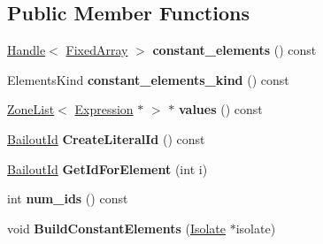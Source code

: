 \subsection*{Public Member Functions}
\begin{DoxyCompactItemize}
\item 
\hyperlink{classv8_1_1internal_1_1_handle}{Handle}$<$ \hyperlink{classv8_1_1internal_1_1_fixed_array}{Fixed\+Array} $>$ {\bfseries constant\+\_\+elements} () const \hypertarget{classv8_1_1internal_1_1_array_literal_a002a9a13a866683dfd5eda8c79262fb7}{}\label{classv8_1_1internal_1_1_array_literal_a002a9a13a866683dfd5eda8c79262fb7}

\item 
Elements\+Kind {\bfseries constant\+\_\+elements\+\_\+kind} () const \hypertarget{classv8_1_1internal_1_1_array_literal_ad4dadd0d290f1922ef4529c2e45ba332}{}\label{classv8_1_1internal_1_1_array_literal_ad4dadd0d290f1922ef4529c2e45ba332}

\item 
\hyperlink{classv8_1_1internal_1_1_zone_list}{Zone\+List}$<$ \hyperlink{classv8_1_1internal_1_1_expression}{Expression} $\ast$ $>$ $\ast$ {\bfseries values} () const \hypertarget{classv8_1_1internal_1_1_array_literal_ad67607b8facceaf7e6af416e265ede83}{}\label{classv8_1_1internal_1_1_array_literal_ad67607b8facceaf7e6af416e265ede83}

\item 
\hyperlink{classv8_1_1internal_1_1_bailout_id}{Bailout\+Id} {\bfseries Create\+Literal\+Id} () const \hypertarget{classv8_1_1internal_1_1_array_literal_a75c6a1be5b563f79cb35fc7662e9d5c9}{}\label{classv8_1_1internal_1_1_array_literal_a75c6a1be5b563f79cb35fc7662e9d5c9}

\item 
\hyperlink{classv8_1_1internal_1_1_bailout_id}{Bailout\+Id} {\bfseries Get\+Id\+For\+Element} (int i)\hypertarget{classv8_1_1internal_1_1_array_literal_ac6c3346b77409ba04b3821968a93adf8}{}\label{classv8_1_1internal_1_1_array_literal_ac6c3346b77409ba04b3821968a93adf8}

\item 
int {\bfseries num\+\_\+ids} () const \hypertarget{classv8_1_1internal_1_1_array_literal_a93f7f58a5ed6da6ae58d47a5c62ebd73}{}\label{classv8_1_1internal_1_1_array_literal_a93f7f58a5ed6da6ae58d47a5c62ebd73}

\item 
void {\bfseries Build\+Constant\+Elements} (\hyperlink{classv8_1_1internal_1_1_isolate}{Isolate} $\ast$isolate)\hypertarget{classv8_1_1internal_1_1_array_literal_a358250fbd37d0c353259dbfad5986260}{}\label{classv8_1_1internal_1_1_array_literal_a358250fbd37d0c353259dbfad5986260}


\end{DoxyCompactItemize}
